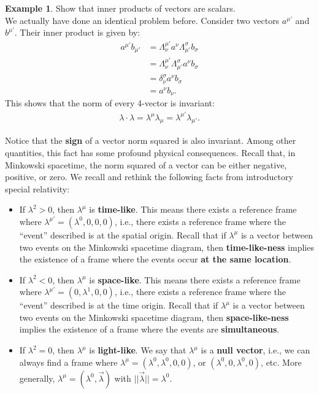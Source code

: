 \documentclass{article}
\theoremstyle{definition}
\newtheorem{exmp}{Example}[section]
\begin{document}
\begin{exmp}
	Show that inner products of vectors are scalars.\\
	
	We actually have done an identical problem before. Consider two vectors $a^{\mu'}$ and $b^{\mu'}$. Their inner product is given by:
	\begin{align*}
	a^{\mu'}b_{\mu'} &= \Lambda^{\mu'}_{\nu}a^{\nu}\Lambda^{\sigma}_{\mu'}b_\sigma\\
	&= \Lambda^{\mu'}_{\nu}\Lambda^{\sigma}_{\mu'}a^{\nu}b_\sigma\\
	&= \delta^\sigma_\nu a^\nu b_\sigma\\
	&= a^\nu b_\nu.
	\end{align*}
	This shows that the norm of every 4-vector is invariant:
	\begin{align*}
	\lambda\cdot\lambda = \lambda^\mu \lambda_\mu = \lambda^{\mu'}\lambda_{\mu'}.
	\end{align*}
\end{exmp}

Notice that the \textbf{sign} of a vector norm squared is also invariant. Among other quantities, this fact has some profound physical consequences. Recall that, in Minkowski spacetime, the norm squared of a vector can be either negative, positive, or zero. We recall and rethink the following facts from introductory special relativity:
\begin{itemize}
	\item If $\lambda^2 > 0$, then $\lambda^\mu$ is \textbf{time-like}. This means there exists a reference frame where $\lambda^{\mu'} = (\lambda^0,0,0,0)$, i.e., there exists a reference frame where the ``event'' described is at the spatial origin. Recall that if $\lambda^\mu$ is a vector between two events on the Minkowski spacetime diagram, then \textbf{time-like-ness} implies the existence of a frame where the events occur \textbf{at the same location}.
	\item If $\lambda^2 < 0$, then $\lambda^\mu$ is \textbf{space-like}. This means there exists a reference frame where $\lambda^{\mu'} = (0, \lambda^1,0,0)$, i.e., there exists a reference frame where the ``event'' described is at the time origin. Recall that if $\lambda^\mu$ is a vector between two events on the Minkowski spacetime diagram, then \textbf{space-like-ness} implies the existence of a frame where the events are \textbf{simultaneous}.
	\item If $\lambda^2 = 0$, then $\lambda^\mu$ is \textbf{light-like}. We say that $\lambda^\mu$ is a \textbf{null vector}, i.e., we can always find a frame where $\lambda^\mu = (\lambda^0, \lambda^0,0,0)$, or $(\lambda^0, 0, \lambda^0, 0)$, etc. More generally, $\lambda^\mu = (\lambda^0, \vec{\lambda})$ with $\vert\vert\vec{\lambda}\vert\vert = \lambda^0$.\\
\end{itemize}
\end{document}
